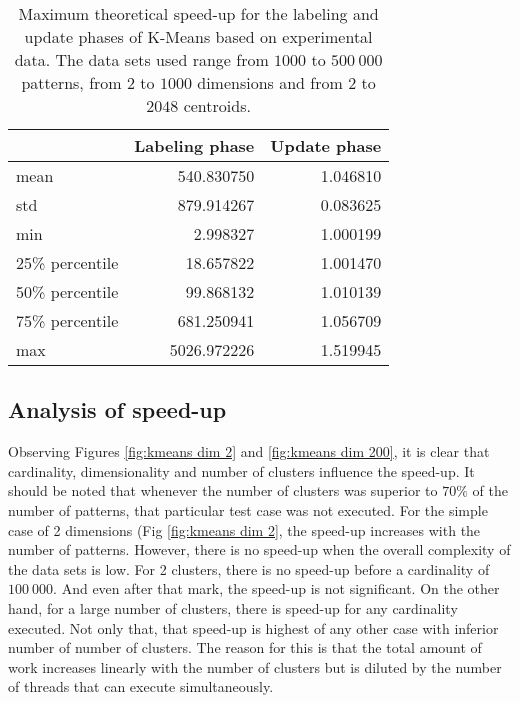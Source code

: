 \begin{table}[h]
\centering
\caption{Maximum theoretical speed-up for the labeling and update phases of K-Means based on experimental data. The data sets used range from $1000$ to $500 \: 000$ patterns, from $2$ to $1000$ dimensions and from $2$ to $2048$ centroids.}

\begin{tabular}{lrr}
\toprule
{} &  Labeling phase &  Update phase \\
\midrule
mean  &               540.830750 &                    1.046810 \\
std   &               879.914267 &                    0.083625 \\
min   &                 2.998327 &                    1.000199 \\
25\% percentile &      18.657822 &                    1.001470 \\
50\% percentile &      99.868132 &                    1.010139 \\
75\% percentile &     681.250941 &                    1.056709 \\
max   &              5026.972226 &                    1.519945 \\
\bottomrule
\end{tabular}

\label{tab:kmeans max speedup}
\end{table}


\subsection{Analysis of speed-up}

Observing Figures \ref{fig:kmeans dim 2} and \ref{fig:kmeans dim 200}, it is clear that cardinality, dimensionality and number of clusters influence the speed-up.
It should be noted that whenever the number of clusters was superior to $70\%$ of the number of patterns, that particular test case was not executed.
For the simple case of 2 dimensions (Fig \ref{fig:kmeans dim 2}, the speed-up increases with the number of patterns.
However, there is no speed-up when the overall complexity of the data sets is low.
For 2 clusters, there is no speed-up before a cardinality of $100 \: 000$.
And even after that mark, the speed-up is not significant.
On the other hand, for a large number of clusters, there is speed-up for any cardinality executed.
Not only that, that speed-up is highest of any other case with inferior number of number of clusters.
The reason for this is that the total amount of work increases linearly with the number of clusters but is diluted by the number of threads that can execute simultaneously.

